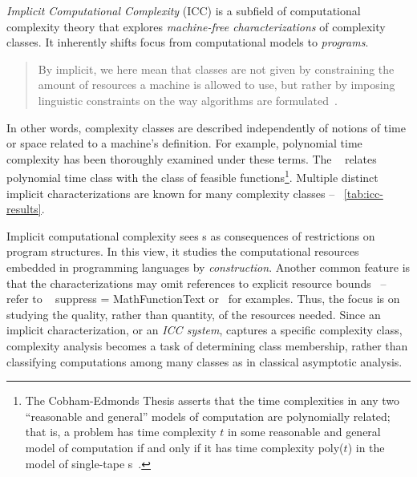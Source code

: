 \emph{Implicit Computational Complexity} (ICC) is a subfield of computational
complexity theory that explores \emph{machine-free
characterizations} of complexity classes. It
inherently shifts focus from computational models to
\emph{programs}.
\begin{quotation}
\noindent By implicit, we here mean that classes are not given by constraining
the amount of resources a machine is
allowed to use, but rather by imposing linguistic constraints on the way
algorithms are formulated~\cite[p. 90]{dallago2011}.
\end{quotation}
In other words, complexity classes are described
independently of notions of time or space related to a machine's definition. For
example, polynomial time complexity has been thoroughly examined under
these terms. The ~\cite{cobham1965,edmonds1965}
relates polynomial time class with the class of feasible functions\footnote{ The
Cobham-Edmonds Thesis asserts that the time complexities in any two
\enquote{reasonable and general} models of computation are polynomially related;
that is, a problem has time complexity \(t\) in some reasonable and general
model of computation if and only if it has time complexity poly(\(t\)) in the
model of single-tape s~\cite[p. 33]{goldreich2008}.}.
Multiple distinct implicit characterizations are known for many complexity
classes -- \cf~\autoref{tab:icc-results}.

Implicit computational complexity sees s as consequences
of restrictions on program structures. In this view, it studies the
computational resources embedded in programming languages by
\emph{construction}. Another common feature is that the characterizations may
omit references to explicit resource bounds~\cite{moyen2017} -- refer to \eg~%
suppress = MathFunctionText \textcite{bellantoni1992}
or~\textcite{kristiansen2005} for examples. Thus, the focus is on studying the
quality, rather than quantity, of the resources needed. Since an implicit
characterization, or an \emph{ICC system}, captures a specific complexity
class, complexity analysis becomes a task of
determining class membership, rather than classifying computations among many
classes as in classical asymptotic analysis.


